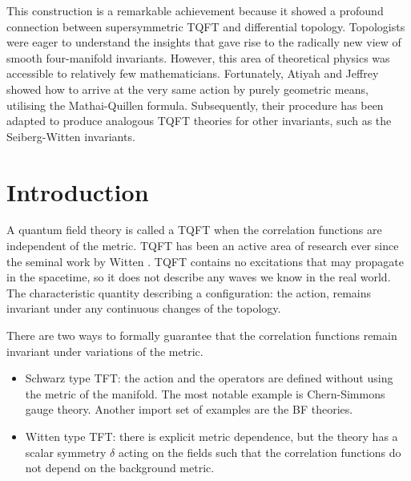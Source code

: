 This construction is a remarkable achievement because it showed a profound
connection between supersymmetric TQFT and differential topology. 
Topologists were eager to understand the insights that gave rise to the radically
new view of smooth four-manifold invariants. However, this area of theoretical physics
was accessible to relatively few mathematicians. 
Fortunately, Atiyah and Jeffrey showed how to arrive at the very same action by 
purely geometric means, utilising the Mathai-Quillen formula. 
Subsequently, their procedure has been adapted to produce analogous TQFT
theories for other invariants, such as the Seiberg-Witten invariants.  

\section*{Introduction}

A quantum field theory is called a TQFT when the correlation functions are
independent of the metric. 
TQFT has been an active area of research ever since the seminal work by Witten
\cite{wittenTQFT}. TQFT contains no excitations that may propagate in the
spacetime, so it does not describe any waves we know in the real world. The
characteristic quantity describing a configuration: the action, remains
invariant under any continuous changes of the topology. 

There are two ways to formally guarantee that the correlation functions remain
invariant under variations of the metric. %
\begin{itemize}
	\item Schwarz type TFT: the action and the operators are defined without 
		using the metric of the manifold. The most notable example is
		Chern-Simmons gauge theory. Another import set of examples are the BF
		theories. 
	\item Witten type TFT: there is explicit metric
	dependence, but the theory has a scalar symmetry $\delta$ acting on
	the fields such that the correlation
	functions do not depend on the background metric. 
\end{itemize}

